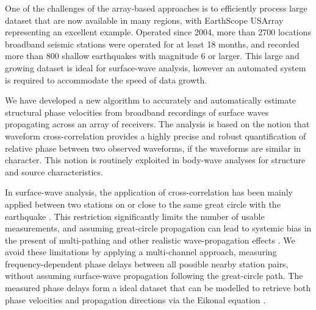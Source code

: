
One of the challenges of the array-based approaches is to efficiently process large dataset that are now available in many regions, with EarthScope USArray representing an excellent example.
Operated since 2004, more than 2700 locations broadband seismic stations were operated for at least 18 months, and recorded more than 800 shallow earthquakes with magnitude 6 or larger. 
This large and growing dataset is ideal for surface-wave analysis, however an automated system is required to accommodate the speed of data growth.



We have developed a new algorithm to accurately and automatically estimate structural phase velocities from broadband recordings of surface waves propagating across an array of receivers.  The analysis is based on the notion that waveform cross-correlation provides a highly precise and robust quantification of relative phase between two observed waveforms, if the waveforms are similar in character.  This notion is routinely exploited in body-wave analyses for structure \citep[e.g.,][]{VanDecar:1990vs} and source \citep[e.g.,][]{Schaff:2004dv} characteristics. 

In surface-wave analysis, the application of cross-correlation \citep[e.g.,][]{Landisman:1969gt} has been mainly applied between two stations on or close to the same great circle with the earthquake \citep[e.g.][]{Knopoff:1966th,Brisbourne:1998hh,Yao:2005ha}. This restriction significantly limits the number of usable measurements, and assuming great-circle propagation can lead to systemic bias in the present of multi-pathing and other realistic wave-propagation effects \citep[e.g.,][]{foster:2014kna}. 
We avoid these limitations by applying a multi-channel approach, measuring frequency-dependent phase delays between all possible nearby station pairs, without assuming surface-wave propagation following the great-circle path. The measured phase delays form a ideal dataset that can be modelled to retrieve both phase velocities and propagation directions via the Eikonal equation \citep{Lin:2009fx}.

